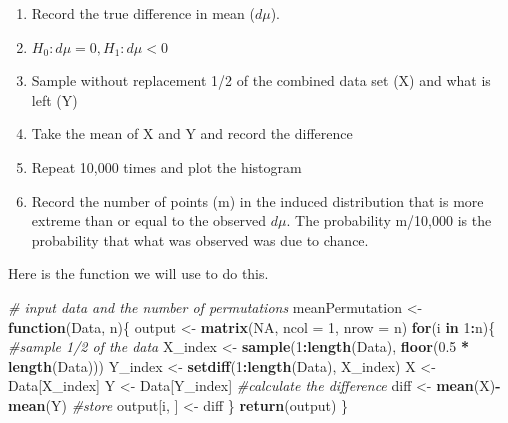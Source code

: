 \documentclass[]{article}
\newenvironment{Shaded}{\begin{snugshade}}{\end{snugshade}}
\newcommand{\CommentTok}[1]{\textcolor[rgb]{0.56,0.35,0.01}{\textit{#1}}}
\newcommand{\ControlFlowTok}[1]{\textcolor[rgb]{0.13,0.29,0.53}{\textbf{#1}}}
\newcommand{\DataTypeTok}[1]{\textcolor[rgb]{0.13,0.29,0.53}{#1}}
\newcommand{\DecValTok}[1]{\textcolor[rgb]{0.00,0.00,0.81}{#1}}
\newcommand{\FloatTok}[1]{\textcolor[rgb]{0.00,0.00,0.81}{#1}}
\newcommand{\KeywordTok}[1]{\textcolor[rgb]{0.13,0.29,0.53}{\textbf{#1}}}
\newcommand{\NormalTok}[1]{#1}
\newcommand{\OperatorTok}[1]{\textcolor[rgb]{0.81,0.36,0.00}{\textbf{#1}}}
\newcommand{\OtherTok}[1]{\textcolor[rgb]{0.56,0.35,0.01}{#1}}
\newcommand{\StringTok}[1]{\textcolor[rgb]{0.31,0.60,0.02}{#1}}
\providecommand{\tightlist}{%
  \setlength{\itemsep}{0pt}\setlength{\parskip}{0pt}}
\begin{document}
\begin{enumerate}
\def\labelenumi{\arabic{enumi}.}
\setcounter{enumi}{-1}
\tightlist
\item
  Record the true difference in mean (\(d\mu\)).
\item
  \(H_0: d\mu = 0, H_1: d\mu < 0\)
\item
  Sample without replacement 1/2 of the combined data set (X) and what
  is left (Y)
\item
  Take the mean of X and Y and record the difference
\item
  Repeat 10,000 times and plot the histogram
\item
  Record the number of points (m) in the induced distribution that is
  more extreme than or equal to the observed \(d\mu\). The probability
  m/10,000 is the probability that what was observed was due to chance.
\end{enumerate}

Here is the function we will use to do this.

\begin{Shaded}
\begin{Highlighting}[]
\CommentTok{# input data and the number of permutations}
\NormalTok{meanPermutation <-}\StringTok{ }\ControlFlowTok{function}\NormalTok{(Data, n)\{}
\NormalTok{  output <-}\StringTok{ }\KeywordTok{matrix}\NormalTok{(}\OtherTok{NA}\NormalTok{, }\DataTypeTok{ncol =} \DecValTok{1}\NormalTok{, }\DataTypeTok{nrow =}\NormalTok{ n)}
  \ControlFlowTok{for}\NormalTok{(i }\ControlFlowTok{in} \DecValTok{1}\OperatorTok{:}\NormalTok{n)\{}
    \CommentTok{#sample 1/2 of the data}
\NormalTok{    X_index <-}\StringTok{ }\KeywordTok{sample}\NormalTok{(}\DecValTok{1}\OperatorTok{:}\KeywordTok{length}\NormalTok{(Data), }\KeywordTok{floor}\NormalTok{(}\FloatTok{0.5} \OperatorTok{*}\StringTok{ }\KeywordTok{length}\NormalTok{(Data)))}
\NormalTok{    Y_index <-}\StringTok{ }\KeywordTok{setdiff}\NormalTok{(}\DecValTok{1}\OperatorTok{:}\KeywordTok{length}\NormalTok{(Data), X_index)}
\NormalTok{    X <-}\StringTok{ }\NormalTok{Data[X_index]}
\NormalTok{    Y <-}\StringTok{ }\NormalTok{Data[Y_index]}
    \CommentTok{#calculate the difference}
\NormalTok{    diff <-}\StringTok{ }\KeywordTok{mean}\NormalTok{(X)}\OperatorTok{-}\KeywordTok{mean}\NormalTok{(Y)}
    \CommentTok{#store}
\NormalTok{    output[i, ] <-}\StringTok{ }\NormalTok{diff}
\NormalTok{  \} }
  \KeywordTok{return}\NormalTok{(output)}
\NormalTok{\}}
\end{Highlighting}
\end{Shaded}
\end{document}
